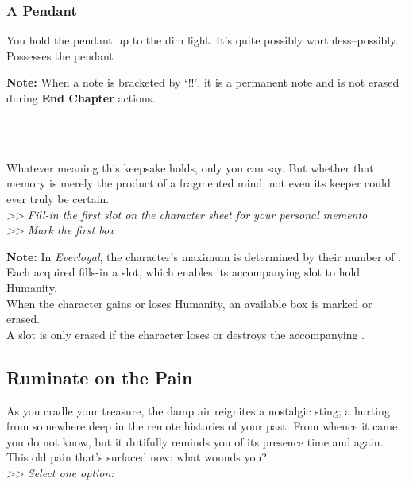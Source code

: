 \begin{multicols}{2}
\subsubsection*{A Pendant}
You hold the pendant up to the dim light. It’s quite possibly worthless--possibly.\\
 Possesses the pendant
\begin{tcolorbox}
\textbf{Note:} When a note is bracketed by ‘!!’, it is a permanent note and is not erased during \textbf{End Chapter} actions.
\end{tcolorbox}
\end{multicols}
\hrule
\ \\
\ \\
Whatever meaning this keepsake holds, only you can say. But whether that memory is merely the product of a fragmented mind, not even its keeper could ever truly be certain.\\
\emph{>> Fill-in the first  slot on the character sheet for your personal memento\\
>> Mark the first  box}
\begin{tcolorbox}
\textbf{Note:} In \emph{Everloyal}, the character’s maximum  is determined by their number of . Each acquired  fills-in a  slot, which enables its accompanying  slot to hold Humanity.\\
When the character gains or loses Humanity, an available  box is marked or erased.\\
A  slot is only erased if the character loses or destroys the accompanying .
\end{tcolorbox}

\subsection*{Ruminate on the Pain}
As you cradle your treasure, the damp air reignites a nostalgic sting; a hurting from somewhere deep in the remote histories of your past. From whence it came, you do not know, but it dutifully reminds you of its presence time and again. This old pain that’s surfaced now: what wounds you?\\
\emph{>> Select one option:}

